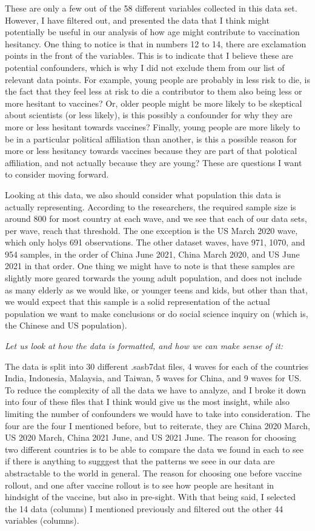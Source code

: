 \documentclass[
]{article}
\begin{document}
These are only a few out of the 58 different variables collected in this
data set. However, I have filtered out, and presented the data that I
think might potentially be useful in our analysis of how age might
contribute to vaccination hesitancy. One thing to notice is that in
numbers 12 to 14, there are exclamation points in the front of the
variables. This is to indicate that I believe these are potential
confounders, which is why I did not exclude them from our list of
relevant data points. For example, young people are probably in less
risk to die, is the fact that they feel less at risk to die a
contributor to them also being less or more hesitant to vaccines? Or,
older people might be more likely to be skeptical about scientists (or
less likely), is this possibly a confounder for why they are more or
less hesitant towards vaccines? Finally, young people are more likely to
be in a particular political affiliation than another, is this a
possible reason for more or less hesitancy towards vaccines because they
are part of that polotical affiliation, and not actually because they
are young? These are questions I want to consider moving forward.

Looking at this data, we also should consider what population this data
is actually representing. According to the researchers, the required
sample size is around 800 for most country at each wave, and we see that
each of our data sets, per wave, reach that threshold. The one exception
is the US March 2020 wave, which only holys 691 observations. The other
dataset waves, have 971, 1070, and 954 samples, in the order of China
June 2021, China March 2020, and US June 2021 in that order. One thing
we might have to note is that these samples are slightly more geared
torwards the young adult population, and does not include as many
elderly as we would like, or younger teens and kids, but other than
that, we would expect that this sample is a solid representation of the
actual population we want to make conclusions or do social science
inquiry on (which is, the Chinese and US population).

\emph{Let us look at how the data is formatted, and how we can make
sense of it:}

The data is split into 30 different .sasb7dat files, 4 waves for each of
the countries India, Indonesia, Malaysia, and Taiwan, 5 waves for China,
and 9 waves for US. To reduce the complexity of all the data we have to
analyze, and I broke it down into four of these files that I think would
give us the most insight, while also limiting the number of confounders
we would have to take into consideration. The four are the four I
mentioned before, but to reiterate, they are China 2020 March, US 2020
March, China 2021 June, and US 2021 June. The reason for choosing two
different countries is to be able to compare the data we found in each
to see if there is anything to sugggest that the patterns we seee in our
data are abstractable to the world in general. The reason for choosing
one before vaccine rollout, and one after vaccine rollout is to see how
people are hesitant in hindsight of the vaccine, but also in pre-sight.
With that being said, I selected the 14 data (columns) I mentioned
previously and filtered out the other 44 variables (columns).
\end{document}
